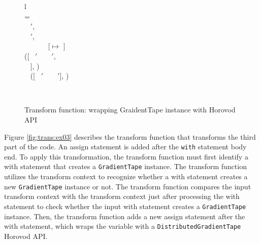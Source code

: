\begin{figure}[ht!]
  \centering
  \begin{tabular}{l}
  \\
  \tstmt{\kwith ~ \mul{\nwithitem} ~ \kcolon ~ \mul{\nstmt}}{\smodenv} = \\
  \inden \ktlet ~ \mul{\nwithitem}$'$,  \kteq ~ \twwithitem{\mul{\nwithitem}}{\smodenv} \ktin \\
  \inden \ktlet ~ \mul{\nstmt}$'$,  \kteq ~  \ktin \\
  \inden \ktif ~  \envsub ~ \smodenv ~ \kteq ~ [\gtape $\mapsto$ \nid] ~ \ktthen\\
  \inden\inden ([\kwith ~ \mul{\nwithitem}$'$ ~ \kcolon ~ \mul{\nstmt}$'$, \\
  \inden\inden \nid ~ ], )\\
  \inden \ktelse ~ ([\kwith ~ \mul{\nwithitem}$'$ ~ \kcolon ~ \mul{\nstmt}$'$], )
\end{tabular}\\\vpar
  \caption{Transform function: wrapping GraidentTape instance with Horovod API}
  \label{fig:trans:fn03}
\end{figure}

Figure \ref{fig:trans:ex03} describes the transform function that transforms
the third part of the code.
An assign statement is added after the {\tt with} statement body end.
To apply this transformation, the transform function must first identify
a with statement that creates a {\tt GradientTape} instance. 
The transform function utilizes the transform context to recognize whether a
with statement creates a new {\tt GradientTape} instance or not. 
The transform function compares the input transform context with the 
transform context just after processing the with statement to check
whether the input with statement creates a {\tt GradientTape} instance.
Then, the transform function adds a new assign statement after the 
with statement, which wraps the variable with a
{\tt DistributedGradientTape} Horovod API.


